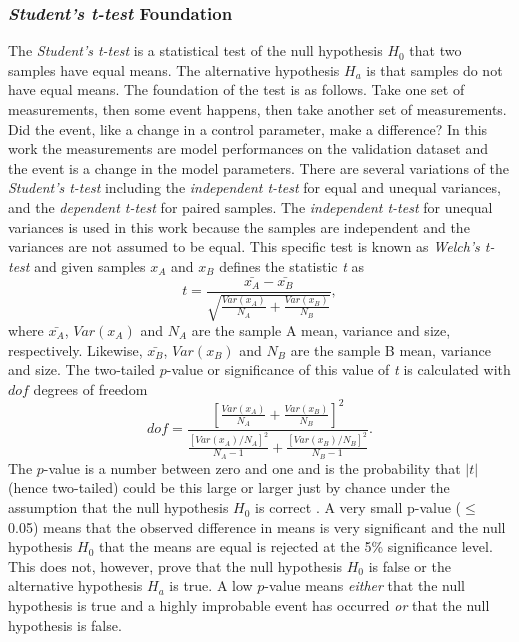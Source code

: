 \subsubsection{\textit{Student's t-test} Foundation}
\label{sec:students_t-test}
The \textit{Student's t-test} is a statistical test of the null hypothesis $H_{0}$ that two samples have equal means. The alternative hypothesis $H_{a}$ is that samples do not have equal means. The foundation of the test is as follows. Take one set of measurements, then some event happens, then take another set of measurements. Did the event, like a change in a control parameter, make a difference? In this work the measurements are model performances on the validation dataset and the event is a change in the model parameters. There are several variations of the \textit{Student's t-test} including the \textit{independent t-test} for equal and unequal variances, and the \textit{dependent t-test} for paired samples. The \textit{independent t-test} for unequal variances is used in this work because the samples are independent and the variances are not assumed to be equal. This specific test is known as \textit{Welch's t-test} and given samples $x_{A}$ and $x_{B}$ defines the statistic \textit{t} as
\begin{equation} \label{eq:t_stat}
	t = \frac{\bar{x_{A}} - \bar{x_{B}}}{\sqrt{\frac{Var(x_{A})}{N_{A}} + \frac{Var(x_{B})}{N_{B}}}},
\end{equation}
where $\bar{x_{A}}$, $Var(x_{A})$ and $N_{A}$ are the sample A mean, variance and size, respectively. Likewise, $\bar{x_{B}}$, $Var(x_{B})$ and $N_{B}$ are the sample B mean, variance and size. The two-tailed $p$-value or significance of this value of \textit{t} is calculated with $dof$ degrees of freedom
\begin{equation} \label{eq:t_dof}
	dof = \frac{\left[\frac{Var(x_{A})}{N_{A}} + \frac{Var(x_{B})}{N_{B}}\right]^{2}}{\frac{\left[Var(x_{A})/N_{A}\right]^{2}}{N_{A} - 1} + \frac{\left[Var(x_{B})/N_{B}\right]^{2}}{N_{B} - 1}}.
\end{equation}
The $p$-value is a number between zero and one and is the probability that $|t|$ (hence two-tailed) could be this large or larger just by chance under the assumption that the null hypothesis $H_{0}$ is correct \cite{10.5555/1403886}. A very small p-value ($\le$ 0.05) means that the observed difference in means is very significant and the null hypothesis $H_{0}$ that the means are equal is rejected at the 5\% significance level. This does not, however, prove that the null hypothesis $H_{0}$ is false or the alternative hypothesis $H_{a}$ is true. A low $p$-value means \textit{either} that the null hypothesis is true and a highly improbable event has occurred \textit{or} that the null hypothesis is false.

